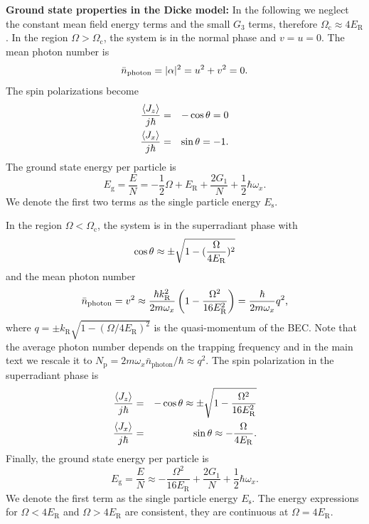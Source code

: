 \documentclass[prl,aps,twocolumn,floatfix]{revtex4}
\begin{document}
\textbf{Ground state properties in the Dicke model:} In the following we
neglect the constant mean field energy terms and the small $G_{3}$ terms,
therefore $\Omega _{\text{c}}\approx 4E_{\text{R}}$. In the region $\Omega
>\Omega _{\text{c}}$, the system is in the normal phase and $v=u=0$. The
mean photon number is%
\begin{equation}
\bar{n}_{\text{photon}}=|\alpha |^{2}=u^{2}+v^{2}=0.  \notag
\end{equation}%
The spin polarizations become
\begin{eqnarray}
\frac{\langle {J_{z}}\rangle }{j\hbar } &=&-\cos \theta =0  \notag \\
\frac{\langle {J_{x}}\rangle }{j\hbar } &=&\sin \theta =-1.  \notag
\end{eqnarray}%
The ground state energy per particle is
\begin{equation*}
E_\text{g}=\frac{E}{N}=-\frac{1}{2}\Omega +E_{\text{R}}+\frac{2G_{1}}{N}+ \frac{1}{2}\hbar \omega _{x} \text{.}
\end{equation*}
We denote the first two terms as the single particle energy $E_\text{s}$.

In the region $\Omega <\Omega _{\text{c}}$, the system is in the
superradiant phase with%
\begin{equation}
\cos \theta \approx \pm \sqrt{1-(\frac{\Omega }{4E_{\text{R}}})^{2}}  \notag
\end{equation}%
and the mean photon number
\begin{equation}
\bar{n}_{\text{photon}}=v^{2}\approx \frac{\hbar k_{\text{R}}^{2}}{2m\omega
_{x}}\left( 1-\frac{\Omega ^{2}}{16E_{\text{R}}^{2}}\right) =\frac{\hbar }{%
2m\omega _{x}}q^{2} \text{,}
\end{equation}%
where $q=\pm k_{\text{R}}\sqrt{1-(\Omega/4E_\text{R})^2}$ is the
quasi-momentum of the BEC. Note that the average photon number depends on
the trapping frequency and in the main text we rescale it to $N_{\text{p}}=
2m\omega _{x} \bar{n}_{\text{photon}}/\hbar\approx q^{2}$. The spin
polarization in the superradiant phase is
\begin{eqnarray}
\frac{\langle {J_{z}}\rangle }{j\hbar } &=&-\cos \theta \approx \pm \sqrt{1-%
\frac{\Omega ^{2}}{16E_{\text{R}}^{2}}}  \notag \\
\frac{\langle {J_{x}}\rangle }{j\hbar } &=&\sin \theta \approx -\frac{\Omega
}{4E_{\text{R}}}.  \notag
\end{eqnarray}%
Finally, the ground state energy per particle is
\begin{equation*}
E_\text{g}=\frac{E}{N}\approx -\frac{\Omega ^{2}}{16E_{\text{R}}}+\frac{2G_{1}}{N}+\frac{1}{2}\hbar \omega _{x} \text{.}
\end{equation*}%
We denote the first term as the single particle energy $E_\text{s}$. The
energy expressions for $\Omega<4E_\text{R}$ and $\Omega>4E_\text{R}$ are
consistent, they are continuous at $\Omega =4E_{\text{R}}$. \newline
\end{document}
